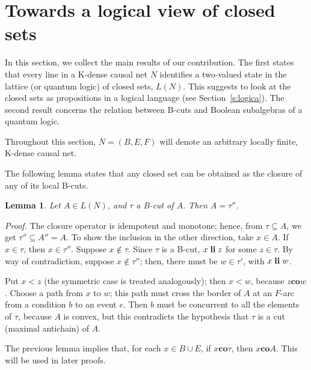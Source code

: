 \documentclass{eptcs}
\newcommand{\co}{\mathrel{\mathbf{co}}}
\newenvironment{proof}{\textit{Proof.}\quad}{\par\vspace{\baselineskip}\relax}
\newtheorem{lemma}{Lemma}
\begin{document}
\section{Towards a logical view of closed sets}\label{s:results}
In this section, we collect the main results of our
contribution. The first states that every line in a
K-dense causal net $N$ identifies a two-valued state in
the lattice (or quantum logic) of closed sets, $L(N)$.
This suggests to look at the closed sets as propositions
in a logical language (see Section~\ref{s:logica}).
The second result concerns the relation between B-cuts
and Boolean subalgebras of a quantum logic.

Throughout this section, $N = (B, E, F)$ will denote an
arbitrary locally finite, K-dense causal net.

The following lemma states that any closed set can be
obtained as the closure of any of its local B-cuts.
\begin{lemma}\label{l:tagliechiusi}
  Let $A \in L(N)$, and $\tau$ a B-cut of $A$.
  Then $A = \tau''$.
\end{lemma}
\begin{proof}
  The closure operator is idempotent and monotone;
  hence, from $\tau \subseteq A$,
  we get $\tau'' \subseteq A'' = A$. To show the inclusion in the
  other direction, take $x \in A$. If $x \in \tau$, then $x \in \tau''$.
  Suppose $x \not\in \tau$. Since $\tau$ is a B-cut, $x \mathrel{\mathbf{li}} z$ for some
  $z \in \tau$. By way of contradiction, suppose $x \not\in \tau''$;
  then, there must be $w \in \tau'$, with $x \mathrel{\mathbf{li}} w$.

  Put $x < z$ (the symmetric case is treated analogously); then $x < w$,
  because $z \co w$. Choose a path from $x$ to $w$; this path must cross
  the border of $A$ at an $F$-arc from a condition $b$ to an event $e$.
  Then $b$ must be concurrent to all the elements of $\tau$, because $A$ is convex,
  but this contradicts the hypothesis that $\tau$ is a cut (maximal
  antichain) of $A$.
\end{proof}
The previous lemma implies that, for each $x \in B \cup E$,
if $x \co \tau$, then $x \co A$. This will be used in later proofs.
\end{document}
